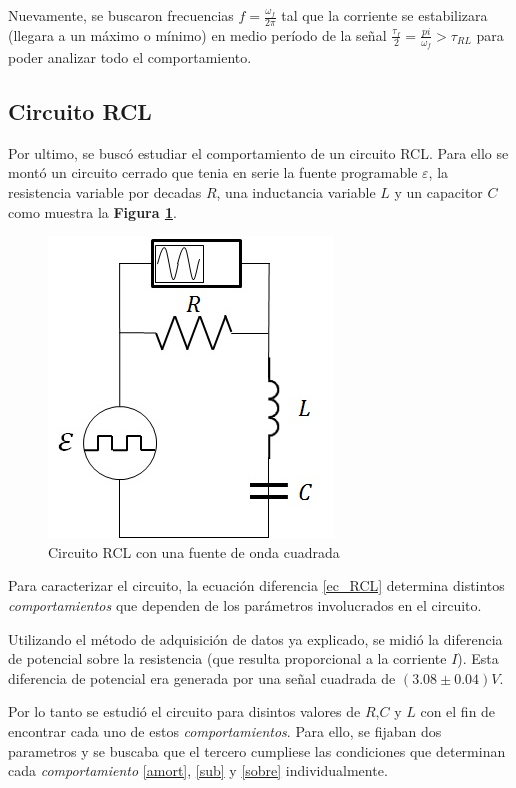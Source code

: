 \documentclass[11pt,a4paper]{article}
\begin{document}
Nuevamente, se buscaron frecuencias $f = \frac{\omega_f}{2\pi}$ tal que la corriente se estabilizara (llegara a un máximo o mínimo) en medio período de la señal $\frac{\tau_f}{2} = \frac{pi}{\omega_f} > \tau_{RL}$ para poder analizar todo el comportamiento.

\subsection{Circuito RCL}

Por ultimo, se buscó estudiar el comportamiento de un circuito RCL. Para ello se montó un circuito cerrado que tenia en serie la fuente programable $\varepsilon$, la resistencia variable por decadas $R$, una inductancia variable $L$ y un capacitor $C$ como muestra la \textbf{Figura \ref{fig:RCL}}.  

\begin{figure}[h]
\centering
\includegraphics[scale=0.7]{Circuito-RCL}
  \caption{Circuito RCL con una fuente de onda cuadrada}
  \label{fig:RCL}
\end{figure}

Para caracterizar el circuito, la ecuación diferencia \eqref{ec_RCL} determina distintos \textit{comportamientos} que dependen de los parámetros involucrados en el circuito.

Utilizando el método de adquisición de datos ya explicado, se midió la diferencia de potencial sobre la resistencia (que resulta proporcional a la corriente $I$). Esta diferencia de potencial era generada por una señal cuadrada de $(3.08 \pm 0.04)V$.

Por lo tanto se estudió el circuito para disintos valores de $R$,$C$ y $L$ con el fin de encontrar cada uno de estos \textit{comportamientos}. Para ello, se fijaban dos parametros y se buscaba que el tercero cumpliese las condiciones que determinan cada \textit{comportamiento} \eqref{amort}, \eqref{sub} y \eqref{sobre} individualmente.
\end{document}

